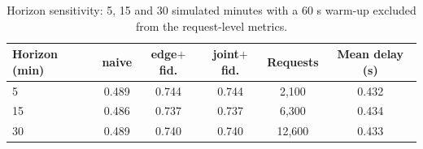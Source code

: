 \begin{table}
\centering
\footnotesize
\caption{Horizon sensitivity: 5, 15 and 30 simulated minutes with a 60 s warm-up excluded from the request-level metrics.}
\label{tab:p2-horizon}
\begin{tabular}{lccccc}
\toprule
Horizon (min) & naive & edge$+$fid. & joint$+$fid. & Requests & Mean delay (s) \\
\midrule
5 & 0.489 & 0.744 & 0.744 & 2,100 & 0.432 \\
15 & 0.486 & 0.737 & 0.737 & 6,300 & 0.434 \\
30 & 0.489 & 0.740 & 0.740 & 12,600 & 0.433 \\
\bottomrule
\end{tabular}
\par\vspace{2pt}{\footnotesize\raggedright The success ratio is stable to within one point, so the result is not a start-up transient and not a steady-state artefact of a single horizon.\par}
\end{table}
